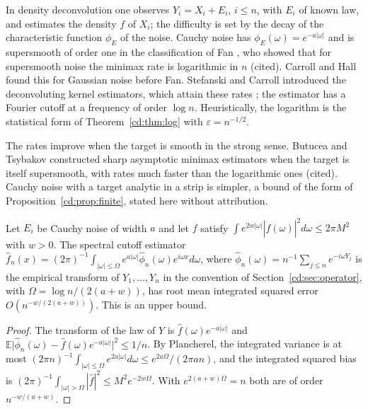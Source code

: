 In density deconvolution one observes $Y_i=X_i+E_i$, $i\le n$, with $E_i$ of known law, and estimates the density $f$ of $X_i$; the difficulty is set by the decay of the characteristic function $\phi_E$ of the noise. Cauchy noise has $\phi_E(\omega)=e^{-a|\omega|}$ and is supersmooth of order one in the classification of Fan \cite{Fan91}, who showed that for supersmooth noise the minimax rate is logarithmic in $n$ (cited). Carroll and Hall \cite{CarrollHall88} found this for Gaussian noise before Fan. Stefanski and Carroll \cite{StefanskiCarroll90} introduced the deconvoluting kernel estimators, which attain these rates \cite{CarrollHall88,Fan91}; the estimator has a Fourier cutoff at a frequency of order $\log n$. Heuristically, the logarithm is the statistical form of Theorem~\ref{cd:thm:log} with $\varepsilon=n^{-1/2}$.

The rates improve when the target is smooth in the strong sense. Butucea and Tsybakov \cite{ButuceaTsybakov08a,ButuceaTsybakov08b} constructed sharp asymptotic minimax estimators when the target is itself supersmooth, with rates much faster than the logarithmic ones (cited). Cauchy noise with a target analytic in a strip is simpler, a bound of the form of Proposition~\ref{cd:prop:finite}, stated here without attribution.

\begin{proposition}[a strip]\label{cd:prop:strip}
Let $E_i$ be Cauchy noise of width $a$ and let $f$ satisfy $\int e^{2w|\omega|}|\widehat f(\omega)|^2d\omega\le2\pi M^2$ with $w>0$. The spectral cutoff estimator $\widehat f_n(x)=(2\pi)^{-1}\int_{|\omega|\le\Omega}e^{a|\omega|}\widehat\phi_n(\omega)e^{i\omega x}d\omega$, where $\widehat\phi_n(\omega)=n^{-1}\sum_{j\le n}e^{-i\omega Y_j}$ is the empirical transform of $Y_1,\dots,Y_n$ in the convention of Section~\ref{cd:sec:operator}, with $\Omega=\log n/(2(a+w))$, has root mean integrated squared error $O(n^{-w/(2(a+w))})$. This is an upper bound.
\end{proposition}

\begin{proof}
The transform of the law of $Y$ is $\widehat f(\omega)e^{-a|\omega|}$ and $\mathbb E\lvert\widehat\phi_n(\omega)-\widehat f(\omega)e^{-a|\omega|}\rvert^2\le1/n$. By Plancherel, the integrated variance is at most $(2\pi n)^{-1}\int_{|\omega|\le\Omega}e^{2a|\omega|}d\omega\le e^{2a\Omega}/(2\pi an)$, and the integrated squared bias is $(2\pi)^{-1}\int_{|\omega|>\Omega}|\widehat f|^2\le M^2e^{-2w\Omega}$. With $e^{2(a+w)\Omega}=n$ both are of order $n^{-w/(a+w)}$.
\end{proof}

